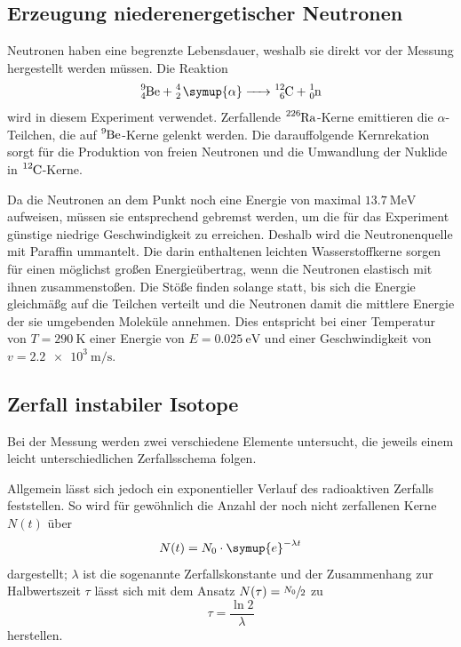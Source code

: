 \subsection{Erzeugung niederenergetischer Neutronen}

Neutronen haben eine begrenzte Lebensdauer, weshalb sie direkt vor der Messung hergestellt werden müssen. 
Die Reaktion 
\begin{equation*}
    \ce{^9_4Be + ^4_2 \symup{\alpha} -> ^{12}_6C + ^1_0n}
\end{equation*}
wird in diesem Experiment verwendet. 
Zerfallende $\ce{^{226}Ra}$-Kerne emittieren die $\alpha$-Teilchen, die auf $\ce{^9Be}$-Kerne gelenkt werden. 
Die darauffolgende Kernrekation sorgt für die Produktion von freien Neutronen und die Umwandlung der Nuklide in $\ce{^{12}C}$-Kerne. 

Da die Neutronen an dem Punkt noch eine Energie von maximal $\SI{13.7}{\mega\electronvolt}$ aufweisen, müssen sie 
entsprechend gebremst werden, um die für das Experiment günstige niedrige Geschwindigkeit zu erreichen. 
Deshalb wird die Neutronenquelle mit Paraffin ummantelt. Die darin enthaltenen leichten Wasserstoffkerne sorgen für einen 
möglichst großen Energieübertrag, wenn die Neutronen elastisch mit ihnen zusammenstoßen. 
Die Stöße finden solange statt, bis sich die Energie gleichmäßg auf die Teilchen verteilt und die Neutronen damit
die mittlere Energie der sie umgebenden Moleküle annehmen. Dies entspricht bei einer Temperatur von ${T=\SI{290}{\kelvin}}$ 
einer Energie von ${E=\SI{0.025}{\electronvolt}}$ und einer Geschwindigkeit von $v=\SI{2.2e3}{\meter\per\second}$\cite{Versuchsanleitung}. 

\subsection{Zerfall instabiler Isotope}
\label{sub:keineAhnung}

Bei der Messung werden zwei verschiedene Elemente untersucht, die jeweils einem leicht unterschiedlichen Zerfallsschema folgen. 

Allgemein lässt sich jedoch ein exponentieller Verlauf des radioaktiven Zerfalls feststellen. So wird für gewöhnlich die Anzahl der noch nicht zerfallenen Kerne $N(t)$ über 
\begin{equation*}
    N(t)=N_0 \cdot \symup{e}^{-\lambda t}
\end{equation*}
dargestellt; $\lambda$ ist die sogenannte Zerfallskonstante und der Zusammenhang zur Halbwertszeit $\tau$ lässt sich mit dem 
Ansatz $N(\tau)=\sfrac{N_0}{2}$ zu 
\begin{equation*}
    \tau=\frac{\ln 2}{\lambda}
\end{equation*}
herstellen.

